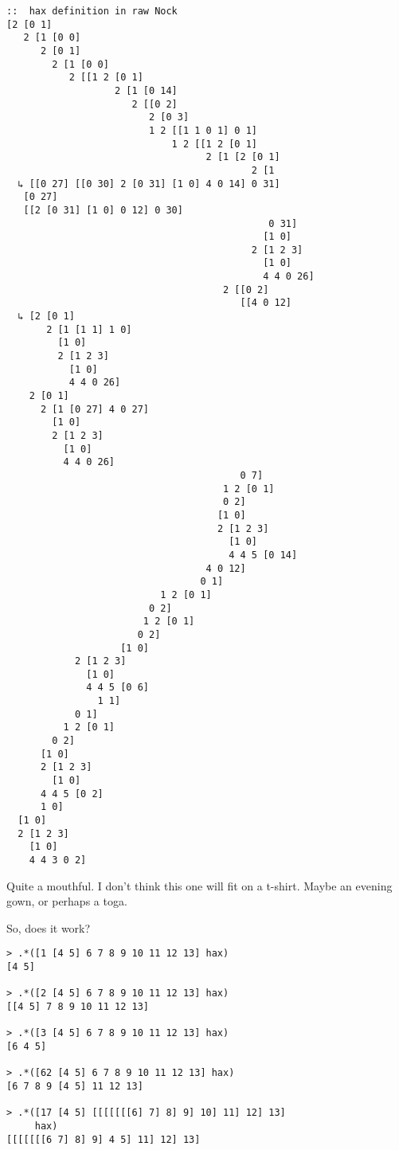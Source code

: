 \documentclass[twoside]{article}
\begin{document}
\begin{lstlisting}[style=listingcode]
::  hax definition in raw Nock
[2 [0 1]
   2 [1 [0 0]
      2 [0 1]
        2 [1 [0 0]
           2 [[1 2 [0 1]
                   2 [1 [0 14]
                      2 [[0 2]
                         2 [0 3]
                         1 2 [[1 1 0 1] 0 1]
                             1 2 [[1 2 [0 1]
                                   2 [1 [2 [0 1]
                                           2 [1
  ↳ [[0 27] [[0 30] 2 [0 31] [1 0] 4 0 14] 0 31]
   [0 27]
   [[2 [0 31] [1 0] 0 12] 0 30]
                                              0 31]
                                             [1 0]
                                           2 [1 2 3]
                                             [1 0]
                                             4 4 0 26]
                                      2 [[0 2]
                                         [[4 0 12]
  ↳ [2 [0 1]
       2 [1 [1 1] 1 0]
         [1 0]
         2 [1 2 3]
           [1 0]
           4 4 0 26]
    2 [0 1]
      2 [1 [0 27] 4 0 27]
        [1 0]
        2 [1 2 3]
          [1 0]
          4 4 0 26]
                                         0 7]
                                      1 2 [0 1]
                                      0 2]
                                     [1 0]
                                     2 [1 2 3]
                                       [1 0]
                                       4 4 5 [0 14]
                                   4 0 12]
                                  0 1]
                           1 2 [0 1]
                         0 2]
                        1 2 [0 1]
                       0 2]
                    [1 0]
            2 [1 2 3]
              [1 0]
              4 4 5 [0 6]
                1 1]
            0 1]
          1 2 [0 1]
        0 2]
      [1 0]
      2 [1 2 3]
        [1 0]
      4 4 5 [0 2]
      1 0]
  [1 0]
  2 [1 2 3]
    [1 0]
    4 4 3 0 2]
\end{lstlisting}

\noindent
Quite a mouthful. I don't think this one will fit on a t-shirt. 
Maybe an evening gown, or perhaps a toga.

So, does it work?

\begin{lstlisting}[style=listingcode]
> .*([1 [4 5] 6 7 8 9 10 11 12 13] hax)
[4 5]

> .*([2 [4 5] 6 7 8 9 10 11 12 13] hax)
[[4 5] 7 8 9 10 11 12 13]

> .*([3 [4 5] 6 7 8 9 10 11 12 13] hax)
[6 4 5]

> .*([62 [4 5] 6 7 8 9 10 11 12 13] hax)
[6 7 8 9 [4 5] 11 12 13]

> .*([17 [4 5] [[[[[[[6] 7] 8] 9] 10] 11] 12] 13]
     hax)
[[[[[[[6 7] 8] 9] 4 5] 11] 12] 13]
\end{lstlisting}
\end{document}
